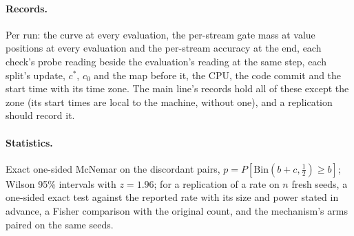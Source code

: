 \documentclass[11pt]{article}
\begin{document}
\paragraph{Records.} Per run: the curve at every evaluation, the per-stream gate mass at value positions at every evaluation and the per-stream accuracy at the end, each check's probe reading beside the evaluation's reading at the same step, each split's update, $c^*$, $c_0$ and the map before it, the CPU, the code commit and the start time with its time zone. The main line's records hold all of these except the zone (its start times are local to the machine, without one), and a replication should record it.

\paragraph{Statistics.} Exact one-sided McNemar on the discordant pairs, $p = P[\mathrm{Bin}(b + c, \tfrac12) \geq b]$; Wilson 95\% intervals with $z = 1.96$; for a replication of a rate on $n$ fresh seeds, a one-sided exact test against the reported rate with its size and power stated in advance, a Fisher comparison with the original count, and the mechanism's arms paired on the same seeds.
\end{document}
